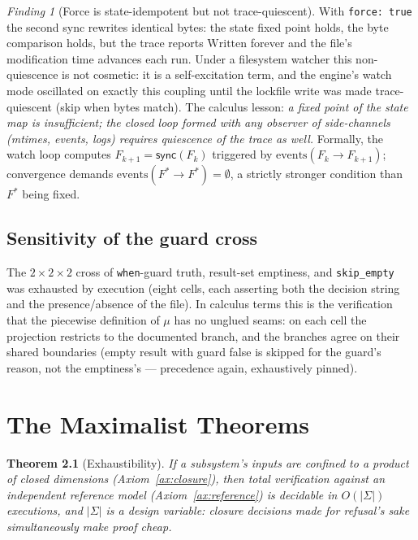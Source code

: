 \documentclass[11pt,a4paper]{report}
\newtheorem{theorem}{Theorem}[chapter]
\theoremstyle{definition}
\theoremstyle{remark}
\newtheorem{finding}[theorem]{Finding}
\newcommand{\sync}{\mathsf{sync}}
\newcommand{\Sig}{\Sigma}
\newcommand{\mymu}{\mu}
\begin{document}
\begin{finding}[Force is state-idempotent but not trace-quiescent]
With \texttt{force:\,true} the second sync rewrites identical bytes:
the state fixed point holds, the byte comparison holds, but the trace
reports $\mathrm{Written}$ forever and the file's modification time advances
each run. Under a filesystem watcher this non-quiescence is not cosmetic:
it is a self-excitation term, and the engine's watch mode oscillated on
exactly this coupling until the lockfile write was made trace-quiescent
(skip when bytes match). The calculus lesson: \emph{a fixed point of the
state map is insufficient; the closed loop formed with any observer of
side-channels (mtimes, events, logs) requires quiescence of the trace as
well.} Formally, the watch loop computes
$F_{k+1} = \sync(F_k)$ triggered by $\mathrm{events}(F_k \to F_{k+1})$;
convergence demands $\mathrm{events}(F^{*} \to F^{*}) = \emptyset$, a
strictly stronger condition than $F^{*}$ being fixed.
\end{finding}

\section{Sensitivity of the guard cross}

The $2 \times 2 \times 2$ cross of \texttt{when}-guard truth, result-set
emptiness, and \texttt{skip\_empty} was exhausted by execution (eight cells,
each asserting both the decision string and the presence/absence of the file).
In calculus terms this is the verification that the piecewise definition of
$\mymu$ has no unglued seams: on each cell the projection restricts to the
documented branch, and the branches agree on their shared boundaries
(empty result with guard false is skipped for the guard's reason, not the
emptiness's --- precedence again, exhaustively pinned).

\chapter{The Maximalist Theorems}

\begin{theorem}[Exhaustibility]\label{thm:exhaust}
If a subsystem's inputs are confined to a product of closed dimensions
(Axiom~\ref{ax:closure}), then total verification against an independent
reference model (Axiom~\ref{ax:reference}) is decidable in
$O(|\Sig|)$ executions, and $|\Sig|$ is a design variable: closure
decisions made for refusal's sake simultaneously make proof cheap.
\end{theorem}
\end{document}

